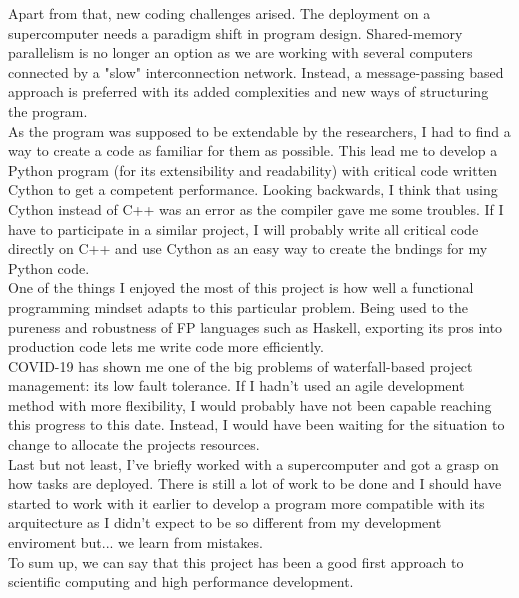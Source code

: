\documentclass{tfg_domingo}
\begin{document}
  Apart from that, new coding challenges arised. The deployment on a
  supercomputer needs a paradigm shift in program design. Shared-memory
  parallelism is no longer an option as we are working with several computers
  connected by a "slow" interconnection network. Instead, a message-passing
  based approach is preferred with its added complexities and new ways of
  structuring the program.\\

  As the program was supposed to be extendable by the researchers, I had to
  find a way to create a code as familiar for them as possible. This lead me to
  develop a Python program (for its extensibility and readability) with
  critical code written Cython to get a competent performance. Looking
  backwards, I think that using Cython instead of C++ was an error as the
  compiler gave me some troubles. If I have to participate in a similar project,
  I will probably write all critical code directly on C++ and use Cython as
  an easy way to create the bndings for my Python code.\\

  One of the things I enjoyed the most of this project is how well a
  functional programming mindset adapts to this particular problem. Being
  used to the pureness and robustness of FP languages such as Haskell, exporting
  its pros into production code lets me write code more efficiently.\\

  COVID-19 has shown me one of the big problems of waterfall-based project
  management: its low fault tolerance. If I hadn't used an agile development
  method with more flexibility, I would probably have not been capable reaching
  this progress to this date. Instead, I would have been waiting for the
  situation to change to allocate the projects resources.\\

  Last but not least, I've briefly worked with a supercomputer and got a grasp
  on how tasks are deployed. There is still a lot of work to be done and I
  should have started to work with it earlier to develop a program more
  compatible with its arquitecture as I didn't expect to be so different from
  my development enviroment but... we learn from mistakes. \\

  To sum up, we can say that this project has been a good first approach to
  scientific computing and high performance development.\\




\backmatter

\end{document}
